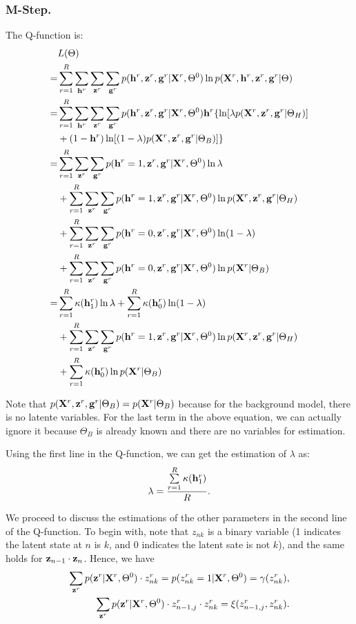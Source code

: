 \subsubsection{M-Step.}

The Q-function is:
\begin{align*}
  &L(\Theta) \\
  = & \sum\limits_{r=1}^R \sum\limits_{\mathbf{h}^r} \sum\limits_{\mathbf{z}^r} \sum\limits_{\mathbf{g}^r} p(\mathbf{h}^r, \mathbf{z}^r, \mathbf{g}^r| \mathbf{X}^r, \Theta^0)
  \ln p(\mathbf{X}^r, \mathbf{h}^r, \mathbf{z}^r, \mathbf{g}^r| \Theta) \\
  = & \sum\limits_{r=1}^R \sum\limits_{\mathbf{h}^r} \sum\limits_{\mathbf{z}^r} \sum\limits_{\mathbf{g}^r} p(\mathbf{h}^r, \mathbf{z}^r, \mathbf{g}^r| \mathbf{X}^r, \Theta^0)
  \mathbf{h}^r \{ \ln [\lambda p(\mathbf{X}^r, \mathbf{z}^r, \mathbf{g}^r| \Theta_H)] \\
   & + (1 - \mathbf{h}^r) \ln [ (1 - \lambda) p(\mathbf{X}^r, \mathbf{z}^r, \mathbf{g}^r| \Theta_B)] \} \\
  = &  \sum\limits_{r=1}^R \sum\limits_{\mathbf{z}^r} \sum\limits_{\mathbf{g}^r} p(\mathbf{h}^r = 1, \mathbf{z}^r, \mathbf{g}^r| \mathbf{X}^r, \Theta^0) \ln \lambda \\
  & + \sum\limits_{r=1}^R \sum\limits_{\mathbf{z}^r} \sum\limits_{\mathbf{g}^r} p(\mathbf{h}^r = 1, \mathbf{z}^r, \mathbf{g}^r| \mathbf{X}^r, \Theta^0) \ln p(\mathbf{X}^r, \mathbf{z}^r, \mathbf{g}^r|  \Theta_H) \\
    & + \sum\limits_{r=1}^R \sum\limits_{\mathbf{z}^r} \sum\limits_{\mathbf{g}^r} p(\mathbf{h}^r = 0, \mathbf{z}^r, \mathbf{g}^r| \mathbf{X}^r, \Theta^0) \ln (1 - \lambda)\\
    & + \sum\limits_{r=1}^R \sum\limits_{\mathbf{z}^r} \sum\limits_{\mathbf{g}^r} p(\mathbf{h}^r = 0, \mathbf{z}^r, \mathbf{g}^r| \mathbf{X}^r, \Theta^0) \ln p(\mathbf{X}^r|  \Theta_B) \\
    = & \sum\limits_{r=1}^R \kappa(\mathbf{h}^r_1)  \ln \lambda + \sum\limits_{r=1}^R \kappa(\mathbf{h}^r_0) \ln (1 - \lambda) \\
    &  + \sum\limits_{r=1}^R \sum\limits_{\mathbf{z}^r} \sum\limits_{\mathbf{g}^r} p(\mathbf{h}^r = 1, \mathbf{z}^r, \mathbf{g}^r| \mathbf{X}^r, \Theta^0) \ln p(\mathbf{X}^r, \mathbf{z}^r, \mathbf{g}^r| \Theta_H) \\
   & + \sum\limits_{r=1}^R \kappa (\mathbf{h}^r_0) \ln p(\mathbf{X}^r| \Theta_B)
\end{align*}

Note that $ p(\mathbf{X}^r, \mathbf{z}^r, \mathbf{g}^r|  \Theta_B) = p(\mathbf{X}^r| \Theta_B)$
because for the background model, there is no latente variables. For the last
term in the above equation, we can actually ignore it because $\Theta_B$ is
already known and there are no variables for estimation.

Using the first line in the Q-function, we can get the estimation of $\lambda$ as:
$$
\lambda = \frac{\sum\limits_{r=1}^R \kappa(\mathbf{h}^r_1) }{R}.
$$


We proceed to discuss the estimations of the other parameters in the second line of the Q-function.
To begin with, note that $z_{nk}$ is a binary variable (1 indicates the latent state at $n$ is $k$, and 0 indicates
the latent sate is not $k$), and the same holds for $\mathbf{z}_{n-1} \cdot \mathbf{z}_{n}$. Hence,  we have
\begin{align*}
\sum\limits_{\mathbf{z}^r} p(\mathbf{z}^r | \mathbf{X}^r, \Theta^0) \cdot z_{nk}^r = p(z_{nk}^r = 1 | \mathbf{X}^r, \Theta^0) = \gamma(z_{nk}^r), \\
\sum\limits_{\mathbf{z}^r} p(\mathbf{z}^r | \mathbf{X}^r, \Theta^0) \cdot z_{n-1, j}^r \cdot z_{nk}^r = \xi(z_{n-1, j}^r, z_{nk}^r).
\end{align*}

